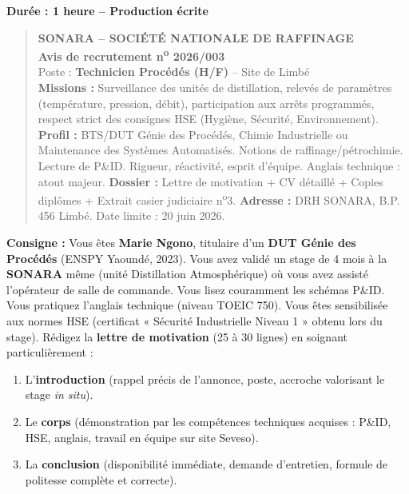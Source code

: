 \documentclass[11pt]{article}
\begin{document}
\begin{exercice}
\textbf{Durée : 1 heure -- Production écrite}
\begin{quote}
\textbf{SONARA -- SOCIÉTÉ NATIONALE DE RAFFINAGE} \\
\textbf{Avis de recrutement n\textsuperscript{o} 2026/003} \\
Poste : \textbf{Technicien Procédés (H/F)} -- Site de Limbé \\
\textbf{Missions :} Surveillance des unités de distillation, relevés de paramètres (température, pression, débit), participation aux arrêts programmés, respect strict des consignes HSE (Hygiène, Sécurité, Environnement).
\textbf{Profil :} BTS/DUT Génie des Procédés, Chimie Industrielle ou Maintenance des Systèmes Automatisés. Notions de raffinage/pétrochimie. Lecture de P\&ID. Rigueur, réactivité, esprit d'équipe. Anglais technique : atout majeur.
\textbf{Dossier :} Lettre de motivation + CV détaillé + Copies diplômes + Extrait casier judiciaire n\textsuperscript{o}3.
\textbf{Adresse :} DRH SONARA, B.P. 456 Limbé. Date limite : 20 juin 2026.
\end{quote}
\textbf{Consigne :} Vous êtes \textbf{Marie Ngono}, titulaire d'un \textbf{DUT Génie des Procédés} (ENSPY Yaoundé, 2023). Vous avez validé un stage de 4 mois à la \textbf{SONARA} même (unité Distillation Atmosphérique) où vous avez assisté l'opérateur de salle de commande. Vous lisez couramment les schémas P\&ID. Vous pratiquez l'anglais technique (niveau TOEIC 750). Vous êtes sensibilisée aux normes HSE (certificat « Sécurité Industrielle Niveau 1 » obtenu lors du stage).
Rédigez la \textbf{lettre de motivation} (25 à 30 lignes) en soignant particulièrement :
\begin{enumerate}
    \item L'\textbf{introduction} (rappel précis de l'annonce, poste, accroche valorisant le stage \emph{in situ}).
    \item Le \textbf{corps} (démonstration par les compétences techniques acquises : P\&ID, HSE, anglais, travail en équipe sur site Seveso).
    \item La \textbf{conclusion} (disponibilité immédiate, demande d'entretien, formule de politesse complète et correcte).
\end{enumerate}
\end{exercice}
\end{document}
